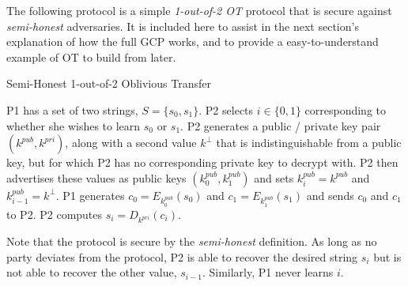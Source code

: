 The following protocol\cite{lindell2013technion} is a simple \emph{1-out-of-2 \ac{OT}} protocol that is secure against \emph{semi-honest} adversaries. It is included here to assist in the next section's explanation of how the full \ac{GCP} works, and to provide a easy-to-understand example of \ac{OT} to build from later.

\begin{algorithm}[H]
    \caption{Semi-Honest 1-out-of-2 Oblivious Transfer}
    \label{alg:otsemihonest}
    \begin{algorithmic}[1]
        \STATE \ac{P1} has a set of two strings, $S = \{s_0, s_1\}$.
        \STATE \ac{P2} selects $i \in \{0, 1\}$ corresponding to whether she wishes to learn $s_0$ or $s_1$.
        \STATE \ac{P2} generates a public / private key pair $(k^{pub}, k^{pri})$, along with a second value $k^\bot$ that is indistinguishable from a public key, but for which \ac{P2} has no corresponding private key to decrypt with.
        \STATE \ac{P2} then advertises these values as public keys $(k^{pub}_0, k^{pub}_1)$ and sets $k^{pub}_i = k^{pub}$ and $k^{pub}_{i-1} = k^\bot$.
        \STATE \ac{P1} generates $c_0 = E_{k^{pub}_0}(s_0)$ and $c_1 = E_{k^{pub}_1}(s_1)$ and sends $c_0$ and $c_1$ to \ac{P2}.
        \STATE \ac{P2} computes $s_i = D_{k^{pri}}(c_i)$.
    \end{algorithmic}
\end{algorithm}

Note that the protocol is secure by the \emph{semi-honest} definition. As long as no party deviates from the protocol, \ac{P2} is able to recover the desired string $s_i$ but is not able to recover the other value, $s_{i-1}$. Similarly, \ac{P1} never learns $i$.

